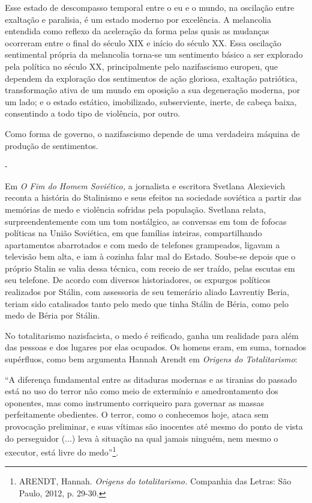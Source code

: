 Esse estado de descompasso temporal entre o eu e o mundo, na oscilação
entre exaltação e paralisia, é um estado moderno por excelência. A
melancolia entendida como reflexo da aceleração da forma pelas quais as
mudanças ocorreram entre o final do século XIX e início do século XX.
Essa oscilação sentimental própria da melancolia torna-se um sentimento
básico a ser explorado pela política no século XX, principalmente pelo
nazifascismo europeu, que dependem da exploração dos sentimentos de ação
gloriosa, exaltação patriótica, transformação ativa de um mundo em
oposição a sua degeneração moderna, por um lado; e o estado estático,
imobilizado, subserviente, inerte, de cabeça baixa, consentindo a todo
tipo de violência, por outro.

Como forma de governo, o nazifascismo depende de uma verdadeira máquina
de produção de sentimentos.

-

Em \emph{O Fim do Homem Soviético,} a jornalista e escritora Svetlana
Alexievich reconta a história do Stalinismo e seus efeitos na sociedade
soviética a partir das memórias de medo e violência sofridas pela
população. Svetlana relata, surpreendentemente com um tom nostálgico, as
conversas em tom de fofocas políticas na União Soviética, em que
famílias inteiras, compartilhando apartamentos abarrotados e com medo de
telefones grampeados, ligavam a televisão bem alta, e iam à cozinha
falar mal do Estado. Soube-se depois que o próprio Stalin se valia dessa
técnica, com receio de ser traído, pelas escutas em seu telefone. De
acordo com diversos historiadores, os expurgos políticos realizados por
Stálin, com assessoria de seu temerário aliado Lavrentiy Beria, teriam
sido catalisados tanto pelo medo que tinha Stálin de Béria, como pelo
medo de Béria por Stálin.

No totalitarismo nazisfacista, o medo é reificado, ganha um realidade
para além das pessoas e dos lugares por elas ocupados. Os homens eram,
em suma, tornados supérfluos, como bem argumenta Hannah Arendt em
\emph{Origens do Totalitarismo}:

``A diferença fundamental entre as ditaduras modernas e as tiranias do
passado está no uso do terror não como meio de extermínio e
amedrontamento dos oponentes, mas como instrumento corriqueiro para
governar as massas perfeitamente obedientes. O terror, como o conhecemos
hoje, ataca sem provocação preliminar, e suas vítimas são inocentes até
mesmo do ponto de vista do perseguidor (...) leva à situação na qual
jamais ninguém, nem mesmo o executor, está livre do medo''\footnote{ARENDT,
  Hannah. \emph{Origens do totalitarismo.} Companhia das Letras: São
  Paulo, 2012, p. 29-30.}.

